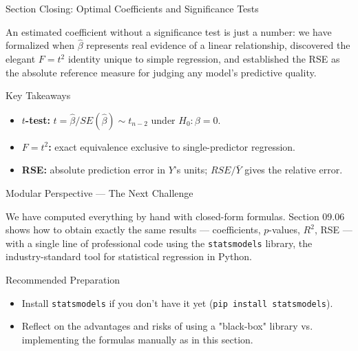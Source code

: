 \documentclass[10pt, aspectratio=169]{beamer}
\begin{document}
\begin{frame}{Section Closing: Optimal Coefficients and Significance Tests}
  \begin{reflexion}
    An estimated coefficient without a significance test is just a number: we have formalized when $\hat\beta$ represents real evidence of a linear relationship, discovered the elegant $F=t^2$ identity unique to simple regression, and established the RSE as the absolute reference measure for judging any model's predictive quality.
  \end{reflexion}

  \vspace{0.2cm}
  \pause
  \begin{block}{Key Takeaways}
    \begin{itemize}\itemsep=0.08cm
      \item \textbf{$t$-test:} $t=\hat\beta/SE(\hat\beta)\sim t_{n-2}$ under $H_0:\beta=0$.
      \item \textbf{$F=t^2$:} exact equivalence exclusive to single-predictor regression.
      \item \textbf{RSE:} absolute prediction error in $Y$'s units; $RSE/\bar Y$ gives the relative error.
    \end{itemize}
  \end{block}
\end{frame}

\begin{frame}{Modular Perspective --- The Next Challenge}
  \scriptsize
  \begin{retoclase}
    We have computed everything by hand with closed-form formulas. Section 09.06 shows how to obtain exactly the same results --- coefficients, $p$-values, $R^2$, RSE --- with a single line of professional code using the \texttt{statsmodels} library, the industry-standard tool for statistical regression in Python.
  \end{retoclase}

  \vspace{0.08cm}
  \pause
  \begin{alertblock}{Recommended Preparation}
    \begin{itemize}\itemsep=0.06cm
      \item Install \texttt{statsmodels} if you don't have it yet (\texttt{pip install statsmodels}).
      \item Reflect on the advantages and risks of using a "black-box" library vs. implementing the formulas manually as in this section.
    \end{itemize}
  \end{alertblock}
\end{frame}
\end{document}
